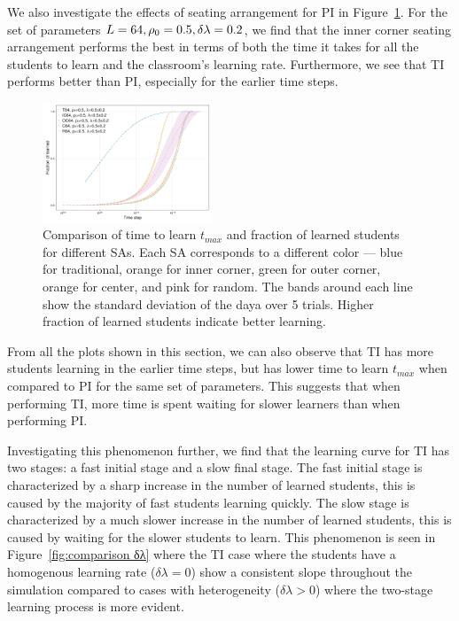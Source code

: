 \documentclass[twocolumn,secnumarabic,amssymb, nobibnotes, aps, prd]{revtex4-2}
\begin{document}
        We also investigate the effects of seating arrangement for PI in Figure~\ref{fig:comparison SA}.
        For the set of parameters $L=64,\space\rho_0=0.5,\space\delta\lambda=0.2$, we find that the inner corner seating arrangement performs the best in terms of both the time it takes for all the students to learn and the classroom's learning rate.
        Furthermore, we see that TI performs better than PI, especially for the earlier time steps.

        \begin{figure}[htbp!]
            \centering
            \includegraphics[width=0.45\textwidth]{figures/2D-BPCAIH-analysis/comparison plots/SA.png}
            \caption{Comparison of time to learn $t_{max}$ and fraction of learned students for different SAs.
            Each SA corresponds to a different color --- blue for traditional, orange for inner corner, green for outer corner, orange for center, and pink for random.
            The bands around each line show the standard deviation of the daya over 5 trials.
            Higher fraction of learned students indicate better learning.}
            \label{fig:comparison SA}
        \end{figure}

        From all the plots shown in this section, we can also observe that TI has more students learning in the earlier time steps, but has lower time to learn $t_{max}$ when compared to PI for the same set of parameters.
        This suggests that when performing TI, more time is spent waiting for slower learners than when performing PI.

        Investigating this phenomenon further, we find that the learning curve for TI has two stages: a fast initial stage and a slow final stage.
        The fast initial stage is characterized by a sharp increase in the number of learned students, this is caused by the majority of fast students learning quickly.
        The slow stage is characterized by a much slower increase in the number of learned students, this is caused by waiting for the slower students to learn.
        This phenomenon is seen in Figure~\ref{fig:comparison δλ} where the TI case where the students have a homogenous learning rate ($\delta\lambda=0$) show a consistent slope throughout the simulation compared to cases with heterogeneity ($\delta\lambda>0$) where the two-stage learning process is more evident.
\end{document}
